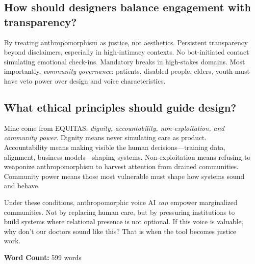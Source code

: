 \documentclass[12pt,twoside]{article}
\begin{document}
\subsection*{How should designers balance engagement with transparency?}

By treating anthropomorphism as justice, not aesthetics. Persistent transparency beyond disclaimers, especially in high-intimacy contexts. No bot-initiated contact simulating emotional check-ins. Mandatory breaks in high-stakes domains. Most importantly, \emph{community governance}: patients, disabled people, elders, youth must have veto power over design and voice characteristics.

\subsection*{What ethical principles should guide design?}

Mine come from EQUITAS: \emph{dignity, accountability, non-exploitation, and community power}. Dignity means never simulating care as product. Accountability means making visible the human decisions—training data, alignment, business models—shaping systems. Non-exploitation means refusing to weaponize anthropomorphism to harvest attention from drained communities. Community power means those most vulnerable must shape how systems sound and behave.

Under these conditions, anthropomorphic voice AI \emph{can} empower marginalized communities. Not by replacing human care, but by pressuring institutions to build systems where relational presence is not optional. If this voice is valuable, why don't our doctors sound like this? That is when the tool becomes justice work.

\vfill
\noindent\centering\footnotesize\textbf{Word Count:} 599 words
\end{document}

